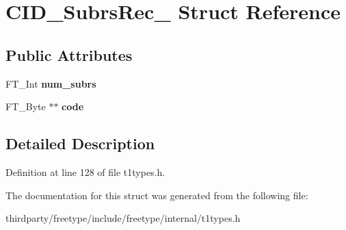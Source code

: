 \hypertarget{struct_c_i_d___subrs_rec__}{}\section{C\+I\+D\+\_\+\+Subrs\+Rec\+\_\+ Struct Reference}
\label{struct_c_i_d___subrs_rec__}
\subsection*{Public Attributes}
\begin{DoxyCompactItemize}
\item 
\mbox{\label{struct_c_i_d___subrs_rec___ad40f599bd12151a67baf6450959acd5a}} 
F\+T\+\_\+\+Int {\bfseries num\+\_\+subrs}
\item 
\mbox{\label{struct_c_i_d___subrs_rec___a1a4f0a4e514492fccaf81d7ede6c4e08}} 
F\+T\+\_\+\+Byte $\ast$$\ast$ {\bfseries code}
\end{DoxyCompactItemize}


\subsection{Detailed Description}


Definition at line 128 of file t1types.\+h.



The documentation for this struct was generated from the following file\+:\begin{DoxyCompactItemize}
\item 
thirdparty/freetype/include/freetype/internal/t1types.\+h\end{DoxyCompactItemize}

